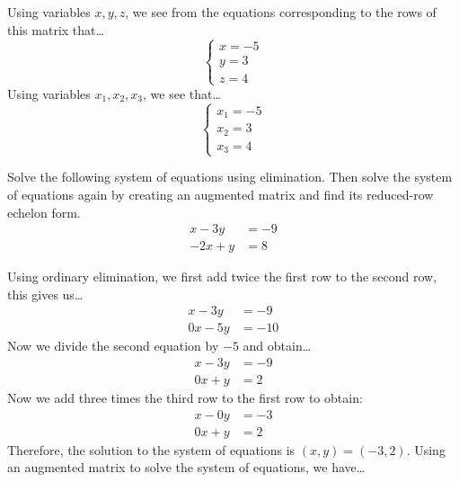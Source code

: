 \documentclass[11pt,letterpaper]{article}
\begin{document}
\sol Using variables $x, y, z$, we see from the equations corresponding to the rows of this matrix that\dots \pspace
	\[
	\begin{cases}
	x= -5 \\
	y= 3 \\
	z= 4
	\end{cases}
	\] \pspace
Using variables $x_1, x_2, x_3$, we see that\dots \pspace
	\[
	\begin{cases}
	x_1= -5 \\
	x_2= 3 \\
	x_3= 4
	\end{cases}
	\]



\newpage



 Solve the following system of equations using elimination. Then solve the system of equations again by creating an augmented matrix and find its reduced-row echelon form.
	\[
	\begin{aligned}
	x - 3y&= -9 \\
	-2x + y&= 8
	\end{aligned}
	\] \pspace

\sol Using ordinary elimination, we first add twice the first row to the second row, this gives us\dots
	\[
	\begin{aligned}
	x - 3y&= -9 \\
	0x - 5y&= -10
	\end{aligned}
	\]
Now we divide the second equation by $-5$ and obtain\dots
	\[
	\begin{aligned}
	x - 3y&= -9 \\
	0x + y&= 2
	\end{aligned}
	\]
Now we add three times the third row to the first row to obtain:
	\[
	\begin{aligned}
	x - 0y&= -3 \\
	0x + y&= 2
	\end{aligned}
	\]
Therefore, the solution to the system of equations is $(x, y)= (-3, 2)$. Using an augmented matrix to solve the system of equations, we have\dots
\end{document}
